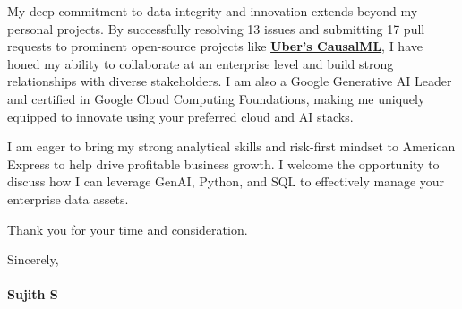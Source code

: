 \documentclass[a4paper,11pt]{article}
\newcommand{\ulink}[2]{\href{#1}{#2}}
\begin{document}
My deep commitment to data integrity and innovation extends beyond my personal projects. By successfully resolving 13 issues and submitting 17 pull requests to prominent open-source projects like \ulink{https://github.com/uber/causalml}{\textbf{Uber's CausalML}}, I have honed my ability to collaborate at an enterprise level and build strong relationships with diverse stakeholders. I am also a Google Generative AI Leader and certified in Google Cloud Computing Foundations, making me uniquely equipped to innovate using your preferred cloud and AI stacks.

I am eager to bring my strong analytical skills and risk-first mindset to American Express to help drive profitable business growth. I welcome the opportunity to discuss how I can leverage GenAI, Python, and SQL to effectively manage your enterprise data assets.

Thank you for your time and consideration.

Sincerely, \\
\vspace{5pt} \\
\textbf{Sujith S}
\end{document}
